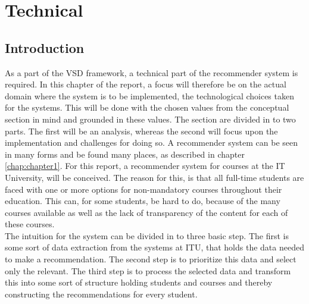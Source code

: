 
 
\section{Technical}

\subsection{Introduction}
As a part of the VSD framework, a technical part of the recommender system is required. In this chapter of the report, a focus will therefore be on the actual domain where the system is to be implemented, the technological choices taken for the systems. This will be done with the chosen values from the conceptual section in mind and grounded in these values. 
The section are divided in to two parts. The first will be an analysis, whereas the second will focus upon the implementation and challenges for doing so. 
A recommender system can be seen in many forms and be found many places, as described in chapter \ref{chap:chapter1}. For this report, a recommender system for courses at the IT University, will be conceived. The reason for this, is that all full-time students are faced with one or more options for non-mandatory courses throughout their education. This can, for some students, be hard to do, because of the many courses available as well as the lack of transparency of the content for each of these courses.\\

The intuition for the system can be divided in to three basic step. The first is some sort of data extraction from the systems at ITU, that holds the data needed to make a recommendation. The second step is to prioritize this data and select only the relevant. The third step is to process the selected data and transform this into some sort of structure holding students and courses and thereby constructing the recommendations for every student.


